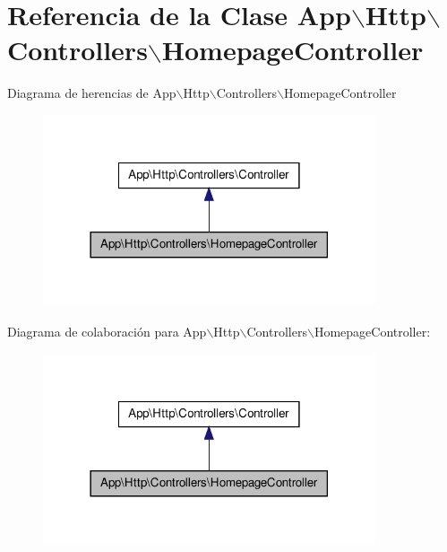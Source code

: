 \hypertarget{class_app_1_1_http_1_1_controllers_1_1_homepage_controller}{\section{\-Referencia de la \-Clase \-App$\backslash$\-Http$\backslash$\-Controllers$\backslash$\-Homepage\-Controller}
\label{class_app_1_1_http_1_1_controllers_1_1_homepage_controller}
}


\-Diagrama de herencias de \-App$\backslash$\-Http$\backslash$\-Controllers$\backslash$\-Homepage\-Controller
\nopagebreak
\begin{figure}[H]
\begin{center}
\leavevmode
\includegraphics[width=278pt]{class_app_1_1_http_1_1_controllers_1_1_homepage_controller__inherit__graph}
\end{center}
\end{figure}


\-Diagrama de colaboración para \-App$\backslash$\-Http$\backslash$\-Controllers$\backslash$\-Homepage\-Controller\-:
\nopagebreak
\begin{figure}[H]
\begin{center}
\leavevmode
\includegraphics[width=278pt]{class_app_1_1_http_1_1_controllers_1_1_homepage_controller__coll__graph}
\end{center}
\end{figure}
